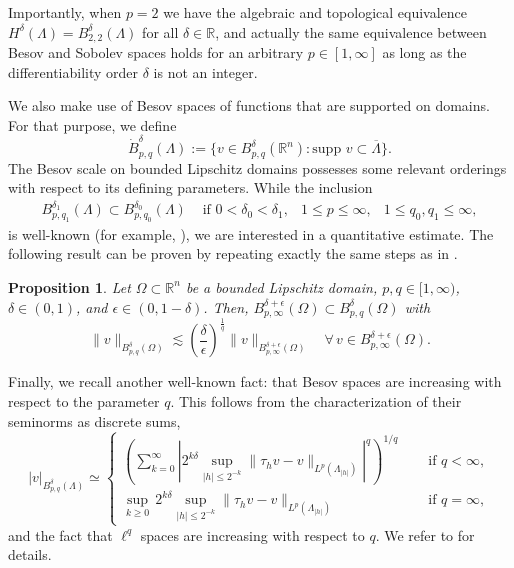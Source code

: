 \documentclass{amsart}
\newcommand{\domain}{\Lambda}
\def\R{{\mathbb R}}
\theoremstyle{plain}
\newtheorem{proposition}{Proposition}
\numberwithin{equation}{section}
\numberwithin{table}{section}
\numberwithin{figure}{section}
\numberwithin{theorem}{section}
\numberwithin{corollary}{section}
\numberwithin{definition}{section}
\numberwithin{lemma}{section}
\numberwithin{proposition}{section}
\numberwithin{remark}{section}
\begin{document}
Importantly, when $p = 2$ we have the algebraic and topological equivalence $H^\delta(\domain) = B^\delta_{2,2}(\domain)$ for all $\delta \in \R$, and actually the same equivalence between Besov and Sobolev spaces holds for an arbitrary $p \in [1,\infty]$ as long as the differentiability order $\delta$ is not an integer.

We also make use of Besov spaces of functions that are supported on domains. For that purpose, we define
\[
\dot{B}^\delta_{p,q}(\domain) := \{ v \in B^\delta_{p,q}(\R^n) \colon \mbox{supp } v \subset \overline \domain \}.
\]
The Besov scale on bounded Lipschitz domains possesses some relevant orderings with respect to its defining parameters. While the inclusion
\[ \begin{array}{llll}
B^{\delta_1}_{p,q_1}(\domain) \subset B^{\delta_0}_{p,q_0}(\domain) & \mbox{ if } 0 < \delta_0 < \delta_1, &   1 \le p \le \infty , & 1 \le q_0, q_1 \le \infty,
\end{array} \]
is well-known (for example, \cite[\S3.3.1]{Triebel10}), we are interested in a quantitative estimate.
The following result can be proven by repeating exactly the same steps as in \cite[Lemma 2.1]{BoLiNo23}.

\begin{proposition}
Let $\Omega \subset \R^n$ be a bounded Lipschitz domain, $p,q \in [1,\infty)$, $\delta\in (0,1)$, and $\epsilon \in (0,1-\delta)$. Then, $B^{\delta+\epsilon}_{p,\infty}(\Omega) \subset B^{\delta}_{p,q} (\Omega)$ with 
\begin{equation}\label{eq:Besov-Sobolev-emb}
\|v\|_{ B^{\delta}_{p,q}(\Omega)} \lesssim 
\left( \frac{\delta}{\epsilon} \right)^{\frac1q} \|v\|_{B^{\delta+\epsilon}_{p,\infty}(\Omega)}  \quad\forall \, v\in B^{\delta+\epsilon}_{p,\infty}(\Omega).
\end{equation}
\end{proposition}

Finally, we recall another well-known fact: that Besov spaces are increasing with respect to the parameter $q$. This follows from the characterization of their seminorms as discrete sums,
\[
| v |_{B^\delta_{p,q}(\domain)} \simeq
\left\lbrace
\begin{aligned}
\left( \sum_{k=0}^\infty | 2^{k\delta} \sup_{|h| \le 2^{-k}} \| \tau_h v - v \|_{L^p(\domain_{|h|})}|^q \right)^{1/q} & \quad \mbox{ if } q < \infty, \\
\sup_{k \ge 0} \, 2^{k\delta} \sup_{|h| \le 2^{-k}} \| \tau_h v - v \|_{L^p(\domain_{|h|})} & \quad \mbox{ if } q = \infty ,
\end{aligned} 
\right.
\]
and the fact that $\ell^q$ spaces are increasing with respect to $q$. We refer to \cite[\S2.10]{DVLo} for details.
\end{document}
